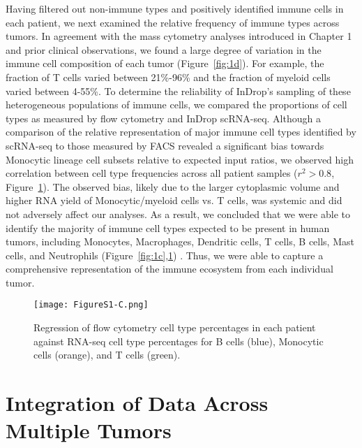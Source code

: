 Having filtered out non-immune types and positively identified immune cells in each patient, we next examined the relative frequency of immune types across tumors.
In agreement with the mass cytometry analyses introduced in Chapter 1 \citep{Chevrier2017,Lavin2017} and prior clinical observations, we found a large degree of variation in the immune cell composition of each tumor (Figure~\ref{fig:1d}). %
For example, the fraction of T cells varied between 21\%-96\% and the fraction of myeloid cells varied between 4-55\%. To determine the reliability of InDrop's sampling of these heterogeneous populations of immune cells, we compared the proportions of cell types as measured by flow cytometry and InDrop scRNA-seq. 
Although a comparison of the relative representation of major immune cell types identified by scRNA-seq to those measured by FACS revealed a significant bias towards Monocytic lineage cell subsets relative to expected input ratios, we observed high correlation between cell type frequencies across all patient samples ($r^2 > 0.8$, Figure~\ref{fig:s1c}). 
The observed bias, likely due to the larger cytoplasmic volume and higher RNA yield of Monocytic/myeloid cells vs. T cells, was systemic and did not adversely affect our analyses.
As a result, we concluded that we were able to identify the majority of immune cell types expected to be present in human tumors, including Monocytes, Macrophages, Dendritic cells, T cells, B cells, Mast cells, and Neutrophils (Figure~\ref{fig:1c},\ref{fig:s1c}) \citep{Jeffrey2006,Novershtern2011}. 
Thus, we were able to capture a comprehensive representation of the immune ecosystem from each individual tumor.

\begin{figure}
\centering
\texttt{[image: FigureS1-C.png]}
\caption{Regression of flow cytometry cell type percentages in each patient against RNA-seq cell type percentages for B cells (blue), Monocytic cells (orange), and T cells (green).
}
\label{fig:s1c}
\end{figure}

\section{Integration of Data Across Multiple Tumors}

